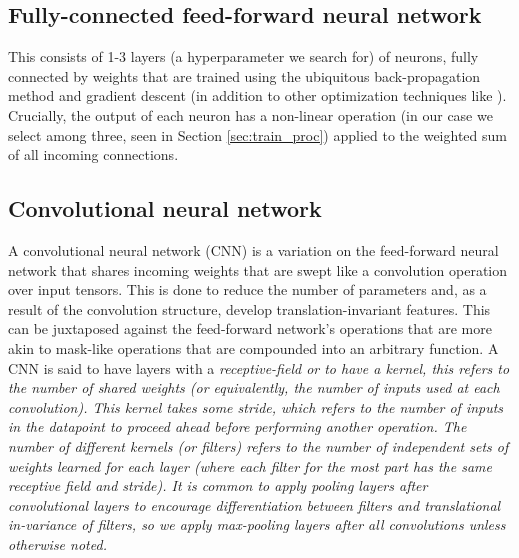 \documentclass[utf8]{frontiersSCNS} %
\begin{document}
\subsection{Fully-connected feed-forward neural network}

This consists of 1-3 layers (a hyperparameter we search for) of neurons, fully connected by weights that are trained using the ubiquitous back-propagation method \cite{Lecunn_phd, GoodfellowTextbook} and gradient descent (in addition to other optimization techniques like \cite{adam, rmsprop, etc}). Crucially, the output of each neuron has a non-linear operation (in our case we select among three, seen in Section \ref{sec:train_proc}) applied to the weighted sum of all incoming connections. %

\subsection{Convolutional neural network}


A convolutional neural network (CNN) \cite{LecunnMNIST, GoodfellowTextbook} is a variation on the feed-forward neural network that shares incoming weights that are swept like a convolution operation over input tensors. This is done to reduce the number of parameters and, as a result of the convolution structure, develop translation-invariant features. This can be juxtaposed against the feed-forward network's operations that are more akin to mask-like operations that are compounded into an arbitrary function. A CNN is said to have layers with a \em{receptive-field} or to have a \em{kernel}, this refers to the number of shared weights (or equivalently, the number of inputs used at each convolution). This kernel takes some {\em stride}, which refers to the number of inputs in the datapoint to proceed ahead before performing another operation. The number of different kernels (or filters) refers to the number of independent sets of weights learned for each layer (where each filter for the most part has the same receptive field and stride). It is common to apply pooling layers \cite{} after convolutional layers to encourage differentiation between filters and translational in-variance of filters, so we apply max-pooling \cite{} layers after all convolutions unless otherwise noted.
\end{document}
